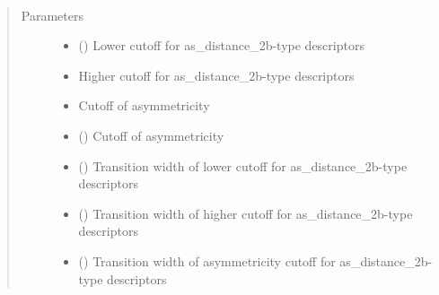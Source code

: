\documentclass[letterpaper,10pt,english]{sphinxmanual}
\begin{document}
\begin{fulllineitems}
\label{\detokenize{descriptors:gap.descriptors.as_distance_2b}}~\begin{quote}\begin{description}
\item[{Parameters}] \leavevmode\begin{itemize}
\item {} 
 () \textendash{} Lower cutoff for as\_distance\_2b-type descriptors

\item {} 
 \textendash{} Higher cutoff for as\_distance\_2b-type descriptors

\item {} 
 \textendash{} Cutoff of asymmetricity

\item {} 
 () \textendash{} Cutoff of asymmetricity

\item {} 
 () \textendash{} Transition width of lower cutoff for as\_distance\_2b-type descriptors

\item {} 
 () \textendash{} Transition width of higher cutoff for as\_distance\_2b-type descriptors

\item {} 
 () \textendash{} Transition width of asymmetricity cutoff for as\_distance\_2b-type descriptors


\end{itemize}
\end{description}
\end{quote}
\end{fulllineitems}
\end{document}
